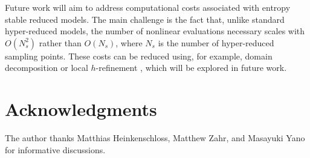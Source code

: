 \documentclass[preprint,10pt]{elsarticle}
\theoremstyle{definition}
\theoremstyle{lemma}
\theoremstyle{theorem}
\theoremstyle{assumption}
\begin{document}
Future work will aim to address computational costs associated with entropy stable reduced models.  The main challenge is the fact that, unlike standard hyper-reduced models, the number of nonlinear evaluations necessary scales with $O(N_s^2)$ rather than $O(N_s)$, where $N_s$ is the number of hyper-reduced sampling points.  These costs can be reduced using, for example, domain decomposition \cite{lucia2003reduced} or local $h$-refinement \cite{carlberg2015adaptive}, which will be explored in future work.

\section{Acknowledgments}

The author thanks Matthias Heinkenschloss, Matthew Zahr, and Masayuki Yano for informative discussions.



\end{document}
